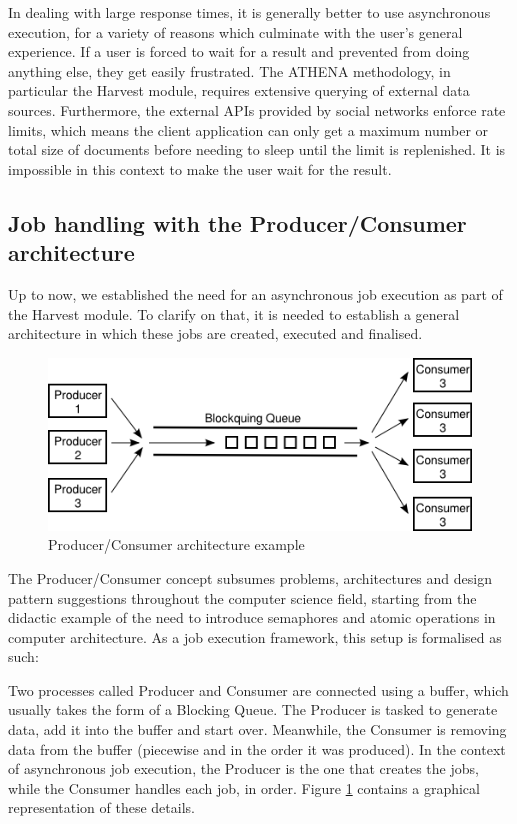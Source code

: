 In dealing with large response times, it is generally better to use asynchronous execution, for a variety of reasons which culminate with the user's general experience. If a user is forced to wait for a result and prevented from doing anything else, they get easily frustrated. The ATHENA methodology, in particular the Harvest module, requires extensive querying of external data sources. Furthermore, the external APIs provided by social networks enforce rate limits, which means the client application can only get a maximum number or total size of documents before needing to sleep until the limit is replenished. It is impossible in this context to make the user wait for the result.

\subsection{Job handling with the Producer/Consumer architecture}
Up to now, we established the need for an asynchronous job execution as part of the Harvest module. To clarify on that, it is needed to establish a general architecture in which these jobs are created, executed and finalised.

\begin{figure}
    \centering
\includegraphics[width=0.8\columnwidth]{img/producer-consumer.png}
    \caption{Producer/Consumer architecture example}
    \label{fig:prodcons}
\end{figure}

The Producer/Consumer concept subsumes problems, architectures and design pattern suggestions throughout the computer science field, starting from the didactic example of the need to introduce semaphores and atomic operations in computer architecture. As a job execution framework, this setup is formalised as such:

Two processes called Producer and Consumer are connected using a buffer, which usually takes the form of a Blocking Queue. The Producer is tasked to generate data, add it into the buffer and start over. Meanwhile, the Consumer is removing data from the buffer (piecewise and in the order it was produced). In the context of asynchronous job execution, the Producer is the one that creates the jobs, while the Consumer handles each job, in order. Figure \ref{fig:prodcons} contains a graphical representation of these details.

